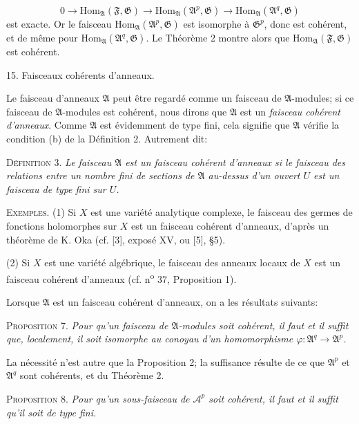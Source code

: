 \begin{equation*}
0 \to \mathrm{Hom}_{\mathfrak{A}}(\mathfrak{F}, \mathfrak{G}) \to \mathrm{Hom}_{\mathfrak{A}}(\mathfrak{A}^p, \mathfrak{G}) \to \mathrm{Hom}_{\mathfrak{A}}(\mathfrak{A}^q, \mathfrak{G})
\end{equation*}
est exacte. Or le faisceau $\mathrm{Hom}_{\mathfrak{A}}(\mathfrak{A}^p, \mathfrak{G})$ est isomorphe à $\mathfrak{G}^p$, donc est cohérent, et de même pour $\mathrm{Hom}_{\mathfrak{A}}(\mathfrak{A}^q, \mathfrak{G})$. Le Théorème 2 montre alors que $\mathrm{Hom}_{\mathfrak{A}}(\mathfrak{F}, \mathfrak{G})$ est cohérent.


15. Faisceaux cohérents d'anneaux.

Le faisceau d'anneaux $\mathfrak{A}$ peut être regardé comme un faisceau de $\mathfrak{A}$-modules; si ce faisceau de $\mathfrak{A}$-modules est cohérent, nous dirons que $\mathfrak{A}$ est un \emph{faisceau cohérent d'anneaux}. Comme $\mathfrak{A}$ est évidemment de type fini, cela signifie que $\mathfrak{A}$ vérifie la condition (b) de la Définition 2. Autrement dit:

\textsc{Définition} 3. \emph{Le faisceau $\mathfrak{A}$ est un faisceau cohérent d'anneaux si le faisceau des relations entre un nombre fini de sections de $\mathfrak{A}$ au-dessus d'un ouvert $U$ est un faisceau de type fini sur $U$.}

\textsc{Exemples}. (1) Si $X$ est une variété analytique complexe, le faisceau des germes de fonctions holomorphes sur $X$ est un faisceau cohérent d'anneaux, d'après un théorème de K. Oka (cf. [3], exposé XV, ou [5], \S 5).

(2) Si $X$ est une variété algébrique, le faisceau des anneaux locaux de $X$ est un faisceau cohérent d'anneaux (cf. n\textsuperscript{o} 37, Proposition 1).

Lorsque $\mathfrak{A}$ est un faisceau cohérent d'anneaux, on a les résultats suivants:

\textsc{Proposition} 7. \emph{Pour qu'un faisceau de $\mathfrak{A}$-modules soit cohérent, il faut et il suffit que, localement, il soit isomorphe au conoyau d'un homomorphisme $\varphi: \mathfrak{A}^q \to \mathfrak{A}^p$.}

La nécessité n'est autre que la Proposition 2; la suffisance résulte de ce que $\mathfrak{A}^p$ et $\mathfrak{A}^q$ sont cohérents, et du Théorème 2.



\textsc{Proposition} 8. \textit{Pour qu'un sous-faisceau de $\mathcal{A}^p$ soit cohérent, il faut et il suffit qu'il soit de type fini.}

